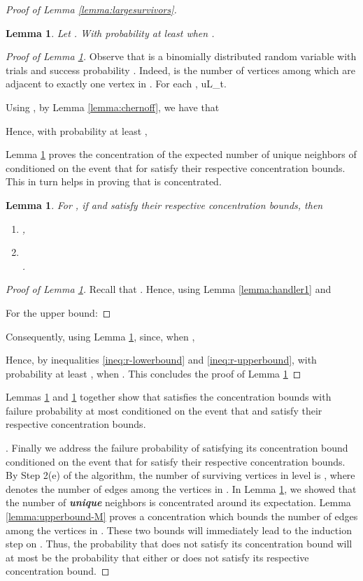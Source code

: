 \documentclass[11pt]{article}
\newtheorem{lemma}[theorem]{Lemma}
\begin{document}
\begin{proof}[Proof of Lemma \ref{lemma:largesurvivors}]
\begin{lemma}\label{lemma:lowerbound-R}
Let . With probability at least  
when .
\end{lemma}
\begin{proof}[Proof of Lemma \ref{lemma:lowerbound-R}]
Observe that  is a binomially distributed random variable with  trials and success probability . Indeed,  is the number of vertices among  which are adjacent to exactly one vertex in . For each , uL_t.

Using , by Lemma \ref{lemma:chernoff}, we have that


Hence, with probability at least ,


Lemma \ref{lemma:lowerbound-qu} proves the concentration of the expected number of unique neighbors of  conditioned on the event that  for  satisfy their respective concentration bounds. This in turn helps in proving that  is concentrated.
\begin{lemma}\label{lemma:lowerbound-qu}
For , if  and  satisfy their respective concentration bounds, then
\begin{enumerate}
\item ,
\item \\
.
\end{enumerate}
\end{lemma}
\begin{proof}[Proof of Lemma \ref{lemma:lowerbound-qu}]
Recall that . Hence, 
using Lemma \ref{lemma:handler1} and

For the upper bound:


\end{proof}

Consequently, using Lemma \ref{lemma:lowerbound-qu}, 
since, when ,


Hence, by inequalities \ref{ineq:r-lowerbound} and \ref{ineq:r-upperbound}, with probability at least , 
when . This concludes the proof of Lemma \ref{lemma:lowerbound-R}
\end{proof}
Lemmas \ref{lemma:lowerbound-R} and \ref{lemma:lowerbound-qu} together show that  satisfies the concentration bounds with failure probability at most  conditioned on the event that  and  satisfy their respective concentration bounds.

. Finally we address the failure probability of  satisfying its concentration bound conditioned on the event that  for  satisfy their respective concentration bounds. By Step 2(e) of the algorithm, the number of surviving vertices in level  is , where  denotes the number of edges among the vertices in . In Lemma \ref{lemma:lowerbound-R}, we showed that the number of {\bf \emph{unique}} neighbors  is concentrated around its expectation. Lemma \ref{lemma:upperbound-M} proves a concentration which bounds the number of edges among the vertices in . These two bounds will immediately lead to the induction step on . Thus, the probability that  does not satisfy its concentration bound will at most be the probability that either  or  does not satisfy its respective concentration bound.


\end{proof}
\end{document}
